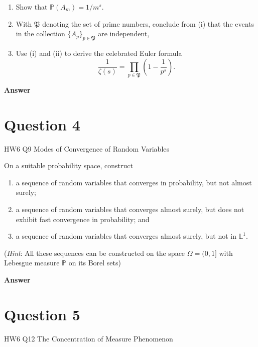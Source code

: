 \documentclass[letterpaper]{article}
\begin{document}
		\begin{enumerate}
			\item[(i)] Show that $\mathbb{P}(A_m)=1/m^{s}$.
			
			\item[(ii)] With $\mathfrak{P}$ denoting the set of prime numbers, conclude from (i) that the events in the collection $\{A_p\}_{p\in\mathfrak{P}}$ are independent,
			
			\item[(iii)] Use (i) and (ii) to derive the celebrated Euler formula
			\[
			\frac{1}{\zeta(s)}=\prod_{p\in\mathfrak{P}}\left(1-\frac{1}{p^{s}}\right).
			\]
		\end{enumerate}
		
		\textbf{Answer}
		
			
		
		\clearpage
		
		\section{Question 4}
		
		{\color{deepred} HW6 Q9 Modes of Convergence of Random Variables}
		
		On a suitable probability space, construct
		\begin{enumerate}
			\item[(i)] a sequence of random variables that converges in probability, but not almost surely;
			
			\item[(ii)] a sequence of random variables that converges almost surely, but does not exhibit fast convergence in probability; and
			
			\item[(iii)] a sequence of random variables that converges almost surely, but not in $\mathbb{L}^{1}$.
		\end{enumerate}
		
		(\emph{Hint}: All these sequences can be constructed on the space $\Omega=(0,1]$ with Lebesgue measure $\mathbb{P}$ on its Borel sets)
		
		
		\textbf{Answer} 
		
		
		
		\clearpage
		
		\section{Question 5}
		
		{\color{deepred} HW6 Q12 The Concentration of Measure Phenomenon}
			
\end{document}
